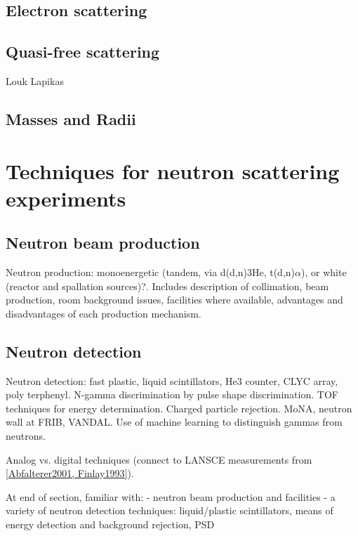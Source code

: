 \subsection{Electron scattering}
\subsection{Quasi-free scattering}
Louk Lapikas

\subsection{Masses and Radii}

\section{Techniques for neutron scattering experiments}
\subsection{Neutron beam production}
Neutron production: monoenergetic (tandem, via d(d,n)3He, t(d,n)$\alpha$),
or white (reactor and spallation sources)?. Includes description of
collimation, beam production, room background issues, facilities where
available, advantages and disadvantages of each production mechanism.

\subsection{Neutron detection}
Neutron detection: fast plastic, liquid scintillators, He3 counter, CLYC array, poly
terphenyl. N-gamma discrimination by pulse shape discrimination. TOF techniques
for energy determination. Charged particle rejection. MoNA, neutron wall at
FRIB, VANDAL. Use of machine learning to distinguish gammas from neutrons.

Analog vs. digital techniques (connect to LANSCE measurements from \ref{Abfalterer2001, Finlay1993}).

At end of section, familiar with:
- neutron beam production and facilities
- a variety of neutron detection techniques: liquid/plastic scintillators,
means of energy detection and background rejection, PSD

